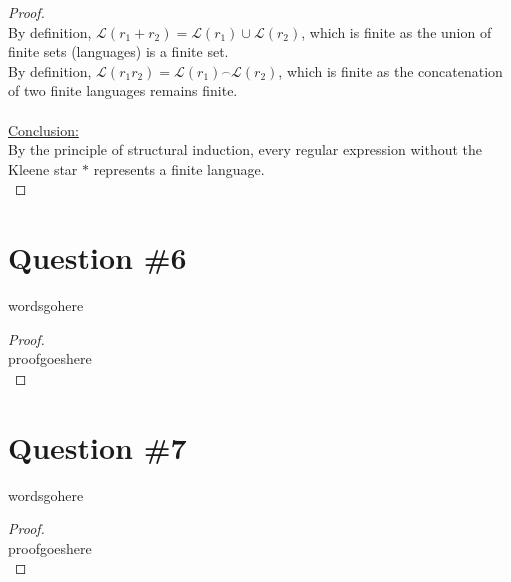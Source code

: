 \documentclass[12pt]{article}
\begin{document}
\begin{proof}
    \\
    By definition, \( \mathcal{L}(r_1 + r_2) = \mathcal{L}(r_1) \cup \mathcal{L}(r_2) \), which is finite as the union of finite sets (languages) is a finite set. \\
    By definition, \( \mathcal{L}(r_1 r_2) = \mathcal{L}(r_1) \overset{\frown}{\ } \mathcal{L}(r_2) \), which is finite as the concatenation of two finite languages remains finite. \\
    \\
    \underline{Conclusion:} \\
    By the principle of structural induction, every regular expression without the Kleene star \( * \) represents a finite language. \\
\end{proof}
\pagebreak

\section*{Question \#6}
wordsgohere

\begin{proof}
\leavevmode\\
    proofgoeshere \\
\end{proof}
\pagebreak

\section*{Question \#7}
wordsgohere

\begin{proof}
\leavevmode\\
    proofgoeshere \\
\end{proof}
\pagebreak
\end{document}
